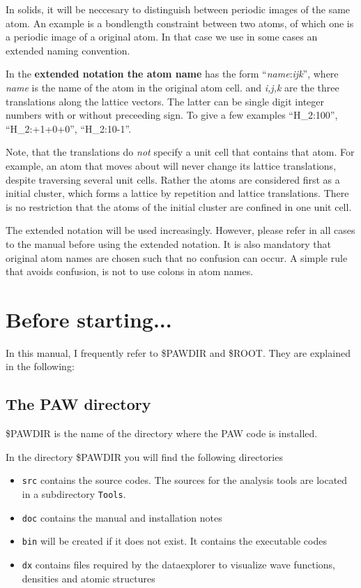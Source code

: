 \documentclass[final,12pt]{article}
\begin{document}
In solids, it will be neccesary to distinguish between periodic images
of the same atom. An example is a bondlength constraint between two
atoms, of which one is a periodic image of a original atom. In that
case we use in some cases an extended naming convention.

In the \textbf{extended notation the atom name} has the form
``\textit{name}:\textit{ijk}'', where {\it name} is the name of the
atom in the original atom cell. and {\it i,j,k} are the three
translations along the lattice vectors. The latter can be single digit
integer numbers with or without preceeding sign. To give a few
examples ``H\_2:100'', ``H\_2:+1+0+0'', ``H\_2:10-1''.

Note, that the translations do {\em not} specify a unit cell that
contains that atom. For example, an atom that moves about will never
change its lattice translations, despite traversing several unit
cells. Rather the atoms are considered first as a initial cluster, which forms
a lattice by repetition and lattice translations. There is no
restriction that the atoms of the initial cluster are confined in one
unit cell.

The extended notation will be used increasingly. However, please refer
in all cases to the manual before using the extended notation. It is
also mandatory that original atom names are chosen such that no
confusion can occur. A simple rule that avoids confusion, is not to
use colons in atom names.

\section{Before starting...}
In this manual, I frequently refer to \$PAWDIR and \$ROOT. They are explained in the following:

\subsection{The PAW directory}
\$PAWDIR is the name of the directory where the PAW code is
installed. 

In the directory \$PAWDIR you will find the following directories 
\begin{itemize}
\item \verb|src| contains the source codes. The sources for the
analysis tools are located in a subdirectory \verb|Tools|.
\item \verb|doc| contains the manual and installation notes
\item \verb|bin| will be created if it does not exist. It contains the
executable codes
\item \verb|dx| contains files required by the dataexplorer to
visualize wave functions, densities and atomic structures
\end{itemize}
\end{document}

